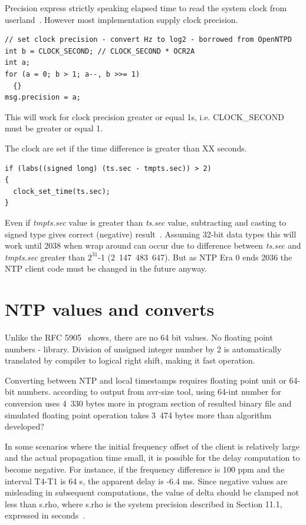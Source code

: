 Precision express strictly speaking elapsed time to read the system clock from userland~\cite{ntp-arch}.
However most implementation supply clock precision.
\begin{lstlisting}
// set clock precision - convert Hz to log2 - borrowed from OpenNTPD
int b = CLOCK_SECOND; // CLOCK_SECOND * OCR2A
int a;
for (a = 0; b > 1; a--, b >>= 1)
  {}
msg.precision = a;
\end{lstlisting}
This will work for clock precision greater or equal 1s, i.e. CLOCK\_SECOND must be greater or equal 1.

The clock are set if the time difference is greater than XX seconds. %
\begin{lstlisting}
if (labs((signed long) (ts.sec - tmpts.sec)) > 2)
{
  clock_set_time(ts.sec);
}
\end{lstlisting}
Even if {\it{tmpts.sec}} value is greater than {\it{ts.sec}} value,
subtracting and casting to signed type gives correct (negative) result~\cite{c99}.
Assuming 32-bit data types this will work until 2038 when wrap around can occur due to difference
between {\it{ts.sec}} and {\it{tmpts.sec}} greater than $2^{31}$-1 (2~147~483~647).
But as NTP Era 0 ends 2036 the NTP client code must be changed in the future anyway.



\section{NTP values and converts}
Unlike the RFC 5905~\cite{rfc5905} shows, there are no 64 bit values. %
No floating point numbers - library.
Division of unsigned integer number by 2 is automatically translated by compiler to logical right shift,
making it fast operation.

Converting between NTP and local timestamps requires floating point unit or 64-bit numbers.
according to output from avr-size tool, using 64-int number for conversion
uses 4~330 bytes more in program section of resulted binary file 
and simulated floating point operation takes 3~474 bytes more
than algorithm developed?

%
In some scenarios where the initial frequency offset of the client is
  relatively large and the actual propagation time small, it is
   possible for the delay computation to become negative.  For instance,
   if the frequency difference is 100 ppm and the interval T4-T1 is 64
   s, the apparent delay is -6.4 ms.  Since negative values are
   misleading in subsequent computations, the value of delta should be
   clamped not less than s.rho, where s.rho is the system precision
   described in Section 11.1, expressed in seconds~\cite{rfc5905}.
%

